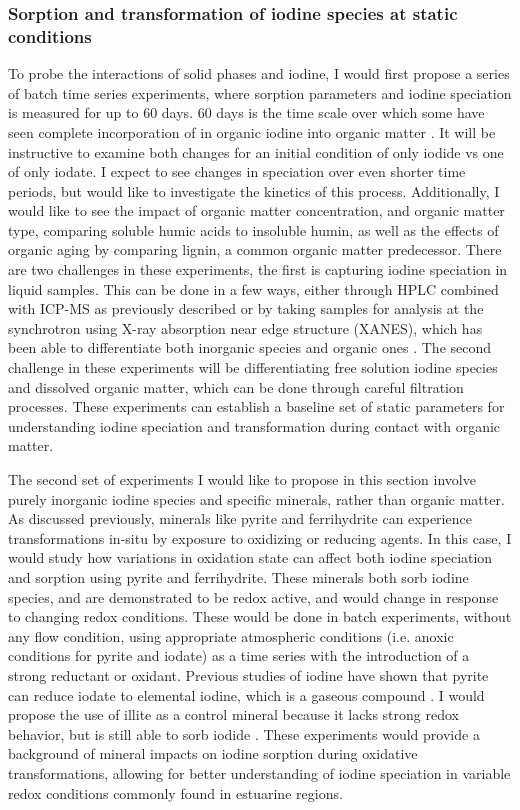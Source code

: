 \documentclass[twoside,12pt,titlepage]{article}
\begin{document}
\subsubsection{Sorption and transformation of iodine species at static conditions}
To probe the interactions of solid phases and iodine, I would first propose a series of batch time series experiments, where sorption parameters and iodine speciation is measured for up to 60 days. 60 days is the time scale over which some have seen complete incorporation of in organic iodine into organic matter \cite{Yamaguchi2008}. It will be instructive to examine both changes for an initial condition of only iodide vs one of only iodate. I expect to see changes in speciation over even shorter time periods, but would like to investigate the kinetics of this process. Additionally, I would like to see the impact of organic matter concentration, and organic matter type, comparing soluble humic acids to insoluble humin, as well as the effects of organic aging by comparing lignin, a common organic matter predecessor. There are two challenges in these experiments, the first is capturing iodine speciation in liquid samples. This can be done in a few ways, either through HPLC combined with ICP-MS as previously described \cite{Wuilloud2005} or by taking samples for analysis at the synchrotron using X-ray absorption near edge structure (XANES), which has been able to differentiate both inorganic species and organic ones \cite{Yamaguchi2008}. The second challenge in these experiments will be differentiating free solution iodine species and dissolved organic matter, which can be done through careful filtration processes. These experiments can establish a baseline set of static parameters for understanding iodine speciation and transformation during contact with organic matter.
\par The second set of experiments I would like to propose in this section involve purely inorganic iodine species and specific minerals, rather than organic matter. As discussed previously, minerals like pyrite and ferrihydrite can experience transformations in-situ by exposure to oxidizing or reducing agents. In this case, I would study how variations in oxidation state can affect both iodine speciation and sorption using pyrite and ferrihydrite. These minerals both sorb iodine species, and are demonstrated to be redox active, and would change in response to changing redox conditions. These would be done in batch experiments, without any flow condition, using appropriate atmospheric conditions (i.e. anoxic conditions for pyrite and iodate) as a time series with the introduction of a strong reductant or oxidant. Previous studies of iodine have shown that pyrite can reduce iodate to elemental iodine, which is a gaseous compound \cite{Kaplan2014}.  I would propose the use of illite as a control mineral because it lacks strong redox behavior, but is still able to sorb iodide \cite{Kaplan2014}. These experiments would provide a background of mineral impacts on iodine sorption during oxidative transformations, allowing for better understanding of iodine speciation in variable redox conditions commonly found in estuarine regions.
\end{document}
